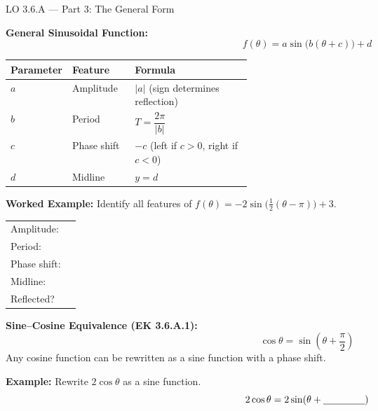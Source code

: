 \documentclass[10pt]{article}
\begin{document}
\begin{notesbox}{LO 3.6.A --- Part 3: The General Form}

\textbf{General Sinusoidal Function:}
$$f(\theta) = a\sin\bigl(b(\theta + c)\bigr) + d$$

\renewcommand{\arraystretch}{1.6}
\begin{tabularx}{\linewidth}{@{} p{0.14\linewidth} p{0.26\linewidth} X @{}}
\hline
\textbf{Parameter} & \textbf{Feature} & \textbf{Formula} \\
\hline
$a$ & Amplitude & $|a|$ \quad (sign determines reflection) \\
$b$ & Period & $T = \dfrac{2\pi}{|b|}$ \\
$c$ & Phase shift & $-c$ \quad (left if $c > 0$, right if $c < 0$) \\
$d$ & Midline & $y = d$ \\
\hline
\end{tabularx}

\vspace{8pt}
\textbf{Worked Example:} Identify all features of
$f(\theta) = -2\sin\!\bigl(\tfrac{1}{2}(\theta - \pi)\bigr) + 3$.

\vspace{4pt}
\begin{tabular}{ll}
Amplitude: & \underline{\hspace{3cm}} \\[6pt]
Period: & \underline{\hspace{3cm}} \\[6pt]
Phase shift: & \underline{\hspace{3cm}} \\[6pt]
Midline: & \underline{\hspace{3cm}} \\[6pt]
Reflected? & \underline{\hspace{3cm}} \\
\end{tabular}

\vspace{8pt}
\textbf{Sine--Cosine Equivalence (EK 3.6.A.1):}
$$\cos\theta = \sin\!\left(\theta + \dfrac{\pi}{2}\right)$$
Any cosine function can be rewritten as a sine function with a phase shift.

\vspace{4pt}
\textbf{Example:} Rewrite $2\cos\theta$ as a sine function.
$$2\cos\theta = 2\sin\!\left(\theta + \underline{\hspace{1.5cm}}\right)$$

\end{notesbox}
\end{document}

